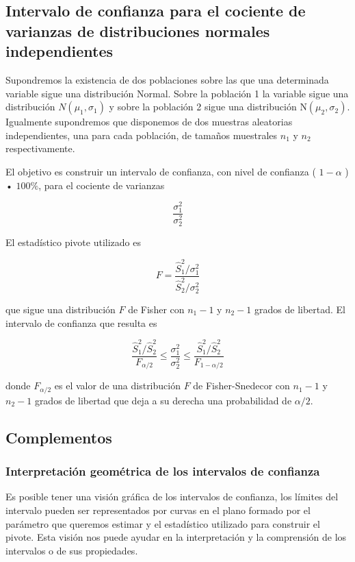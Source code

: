 \documentclass[
]{article}
\begin{document}
\subsection{Intervalo de confianza para el cociente de varianzas de distribuciones normales independientes}\label{intervalo-de-confianza-para-el-cociente-de-varianzas-de-distribuciones-normales-independientes}

Supondremos la existencia de dos poblaciones sobre las que una determinada variable sigue una distribución Normal. Sobre la población 1 la variable sigue una distribución \(N\left(\mu_{1}, \sigma_{1}\right)\) y sobre la población 2 sigue una distribución \(\mathrm{N}\left(\mu_{2}, \sigma_{2}\right)\). Igualmente supondremos que disponemos de dos muestras aleatorias independientes, una para cada población, de tamaños muestrales \(n_{1}\) y \(n_{2}\) respectivamente.

El objetivo es construir un intervalo de confianza, con nivel de confianza ( \(1-\alpha\) ) • \(100 \%\), para el cociente de varianzas

\[
\frac{\sigma_{1}^{2}}{\sigma_{2}^{2}}
\]

El estadístico pivote utilizado es

\[
F=\frac{\hat{S}_{1}^{2} / \sigma_{1}^{2}}{\hat{S}_{2}^{2} / \sigma_{2}^{2}}
\]

que sigue una distribución \(F\) de Fisher con \(n_{1}-1\) y \(n_{2}-1\) grados de libertad.
El intervalo de confianza que resulta es

\[
\frac{\hat{S}_{1}^{2} / \hat{S}_{2}^{2}}{F_{\alpha / 2}} \leq \frac{\sigma_{1}^{2}}{\sigma_{2}^{2}} \leq \frac{\hat{S}_{1}^{2} / \hat{S}_{2}^{2}}{F_{1-\alpha / 2}}
\]

donde \(F_{\alpha / 2}\) es el valor de una distribución \(F\) de Fisher-Snedecor con \(n_{1}-1\) y \(n_{2}-1\) grados de libertad que deja a su derecha una probabilidad de \(\alpha / 2\).

\subsection{Complementos}\label{complementos}

\subsubsection{Interpretación geométrica de los intervalos de confianza}\label{interpretaciuxf3n-geomuxe9trica-de-los-intervalos-de-confianza}

Es posible tener una visión gráfica de los intervalos de confianza, los límites del intervalo pueden ser representados por curvas en el plano formado por el parámetro que queremos estimar y el estadístico utilizado para construir el pivote. Esta visión nos puede ayudar en la interpretación y la comprensión de los intervalos o de sus propiedades.
\end{document}
